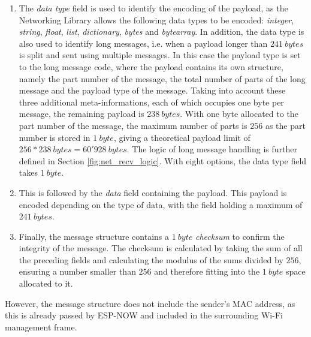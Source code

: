 \begin{enumerate}
    \item The \textit{data type} field is used to identify the encoding of the payload, as the Networking Library allows the following data types to be encoded: \textit{integer}, \textit{string}, \textit{float}, \textit{list}, \textit{dictionary}, \textit{bytes} and \textit{bytearray}. In addition, the data type is also used to identify long messages, i.e. when a payload longer than $241\ bytes$ is split and sent using multiple messages. In this case the payload type is set to the long message code, where the payload contains its own structure, namely the part number of the message, the total number of parts of the long message and the payload type of the message. Taking into account these three additional meta-informations, each of which occupies one byte per message, the remaining payload is $238\ bytes$. With one byte allocated to the part number of the message, the maximum number of parts is $256$ as the part number is stored in $1\ byte$, giving a theoretical payload limit of $256*238\ bytes = 60'928\ bytes$. The logic of long message handling is further defined in Section \ref{fig:net_recv_logic}. With eight options, the data type field takes $1\ byte$.
    \item This is followed by the \textit{data} field containing the payload. This payload is encoded depending on the type of data, with the field holding a maximum of $241\ bytes$.
    \item Finally, the message structure contains a $1\ byte$ \textit{checksum} to confirm the integrity of the message. The checksum is calculated by taking the sum of all the preceding fields and calculating the modulus of the sums divided by $256$, ensuring a number smaller than $256$ and therefore fitting into the $1\ byte$ space allocated to it. 
\end{enumerate}
However, the message structure does not include the sender's MAC address, as this is already passed by ESP-NOW and included in the surrounding Wi-Fi management frame.


